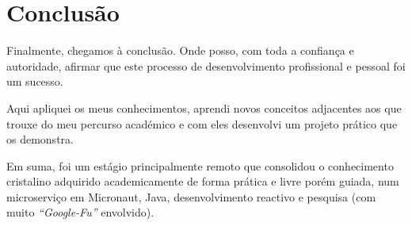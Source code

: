 \chapter{Conclusão}\label{cap6}

Finalmente, chegamos à conclusão. Onde posso, com toda a confiança e autoridade, afirmar que este processo de desenvolvimento profissional e pessoal foi um sucesso.

Aqui apliquei os meus conhecimentos, aprendi novos conceitos adjacentes aos que trouxe do meu percurso académico e com eles desenvolvi um projeto prático que os demonstra.

Em suma, foi um estágio principalmente remoto que consolidou o conhecimento cristalino adquirido academicamente de forma prática e livre porém guiada, num microserviço em Micronaut, Java, desenvolvimento reactivo e pesquisa (com muito \textit{``Google-Fu''} envolvido).